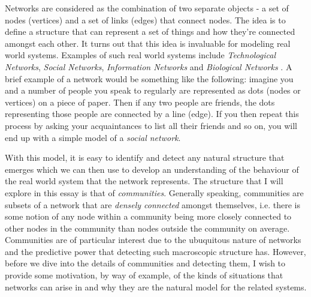 Networks are considered as the combination of two separate objects - a set of nodes (vertices) and a set of links (edges) that connect nodes. The idea is to define a structure that can represent a set of things and how they're connected amongst each other. It turns out that this idea is invaluable for modeling real world systems. Examples of such real world systems include \emph{Technological Networks}, \emph{Social Networks}, \emph{Information Networks} and \emph{Biological Networks} \cite[Contents]{newman10}. A brief example of a network would be something like the following: imagine you and a number of people you speak to regularly are represented as dots (nodes or vertices) on a piece of paper. Then if any two people are friends, the dots representing those people are connected by a line (edge). If you then repeat this process by asking your acquaintances to list all their friends and so on, you will end up with a simple model of a \emph{social network}.

With this model, it is easy to identify and detect any natural structure that emerges which we can then use to develop an understanding of the behaviour of the real world system that the network represents. The structure that I will explore in this essay is that of \emph{communities}. Generally speaking, communities are subsets of a network that are \emph{densely connected} amongst themselves\label{copy:community_intuition}, i.e. there is some notion of any node within a community being more closely connected to other nodes in the community than nodes outside the community on average. Communities are of particular interest due to the ubuquitous nature of networks and the predictive power that detecting such macroscopic structure has. However, before we dive into the details of communities and detecting them, I wish to provide some motivation, by way of example, of the kinds of situations that networks can arise in and why they are the natural model for the related systems.

